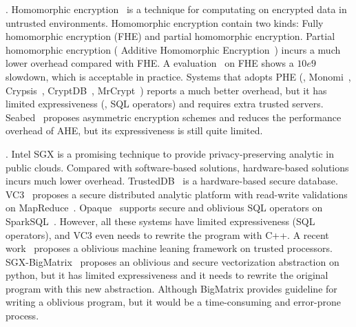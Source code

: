 . Homomorphic 
encryption~\cite{fullmomo:stoc09} is a
technique for computating on encrypted data in untrusted 
environments. Homomorphic encryption contain two kinds: Fully 
homomorphic encryption (FHE) and partial 
homomorphic encryption.
Partial homomorphic encryption (\eg{} Additive Homomorphic 
Encryption~\cite{paillier})
incurs a much lower overhead compared with FHE. A evaluation~\cite{homo:eval} on
FHE shows a $10e9$ slowdown, which is acceptable in practice.
Systems that adopts PHE (\eg, Monomi~\cite{monomi:vldb13},
Crypsis~\cite{crypsis:hotcloud14}, CryptDB~\cite{cryptdb:sosp11},
MrCrypt~\cite{mrcrypt:oospsla14})
reports a much better overhead, but it has limited expressiveness
(\eg, SQL operators) and requires extra trusted 
servers. Seabed~\cite{seabed:osdi16} proposes asymmetric encryption schemes and 
reduces the performance overhead of AHE, but its expressiveness is still quite
limited.

. Intel SGX is a promising technique 
to provide privacy-preserving analytic in public clouds. Compared with 
software-based solutions, hardware-based solutions incurs much lower overhead. 
TrustedDB~\cite{trusteddb:sigmod11} is a hardware-based secure database.
VC3~\cite{vc3:sp15} proposes a secure distributed analytic platform
with read-write validations on MapReduce~\cite{mapreduce}. 
Opaque~\cite{opaque:nsdi17} supports secure and oblivious SQL operators on 
SparkSQL~\cite{sparksql:sigmod15}. However, all these systems have limited 
expressiveness (\eg SQL operators), and VC3 even needs to rewrite the program 
with C++. A recent work~\cite{oblivious:security16} proposes a oblivious 
machine leaning framework on trusted processors. 
SGX-BigMatrix~\cite{bigmatrix:ccs17} proposes an oblivious and secure 
vectorization
abstraction on python, but it has limited expressiveness and it needs to
rewrite the original program with this new abstraction. Although BigMatrix 
provides guideline for writing a oblivious program, but it would be a 
time-consuming and error-prone process.


